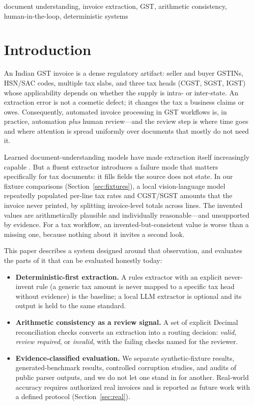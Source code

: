 \documentclass[conference]{IEEEtran}
\begin{document}
\begin{IEEEkeywords}
document understanding, invoice extraction, GST, arithmetic consistency, human-in-the-loop, deterministic systems
\end{IEEEkeywords}

\section{Introduction}
An Indian GST invoice is a dense regulatory artifact: seller and buyer GSTINs, HSN/SAC codes, multiple tax slabs, and three tax heads (CGST, SGST, IGST) whose applicability depends on whether the supply is intra- or inter-state. An extraction error is not a cosmetic defect; it changes the tax a business claims or owes. Consequently, automated invoice processing in GST workflows is, in practice, automation \emph{plus} human review---and the review step is where time goes and where attention is spread uniformly over documents that mostly do not need it.

Learned document-understanding models have made extraction itself increasingly capable \cite{layoutlm, layoutlmv3, donut, docllm}. But a fluent extractor introduces a failure mode that matters specifically for tax documents: it fills fields the source does not state. In our fixture comparisons (Section~\ref{sec:fixtures}), a local vision-language model repeatedly populated per-line tax rates and CGST/SGST amounts that the invoice never printed, by splitting invoice-level totals across lines. The invented values are arithmetically plausible and individually reasonable---and unsupported by evidence. For a tax workflow, an invented-but-consistent value is worse than a missing one, because nothing about it invites a second look.

This paper describes a system designed around that observation, and evaluates the parts of it that can be evaluated honestly today:

\begin{itemize}
\item \textbf{Deterministic-first extraction.} A rules extractor with an explicit never-invent rule (a generic tax amount is never mapped to a specific tax head without evidence) is the baseline; a local LLM extractor is optional and its output is held to the same standard.
\item \textbf{Arithmetic consistency as a review signal.} A set of explicit Decimal reconciliation checks converts an extraction into a routing decision: \emph{valid}, \emph{review required}, or \emph{invalid}, with the failing checks named for the reviewer.
\item \textbf{Evidence-classified evaluation.} We separate synthetic-fixture results, generated-benchmark results, controlled corruption studies, and audits of public parser outputs, and we do not let one stand in for another. Real-world accuracy requires authorized real invoices and is reported as future work with a defined protocol (Section~\ref{sec:real}).
\end{itemize}
\end{document}
